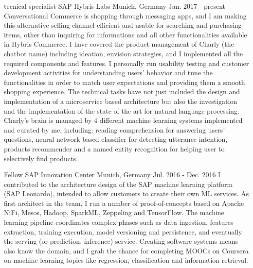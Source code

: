 

\begin{cventries}

  \cventry
    {tecnical specialist} %
    {SAP Hybris Labs} %
    {Munich, Germany} %
    {Jan. 2017 - present} %
    {
      Conversational Commerce is shopping through messaging apps, and I am making this alternative selling channel
      efficient and usable for searching and purchasing items, other than inquiring for informations and
      all other functionalities available in Hybris Commerce.
      I have covered the product management of Charly (the chatbot name) including ideation, envision strategies,
      and I implemented all the required components and features.
      I personally run usability testing and customer development activities for understanding users' behavior and
      tune the functionalities in order to match user expectations and providing them a smooth shopping experience.
      The technical tasks have not just included the design and implementation of a microservice based architecture
      but also the investigation and the implementation of the state of the art for natural language processing.
      Charly's brain is managed by 4 different machine learning systems implemented and curated by me, including: reading comprehension for answering users'
      questions, neural network based classifier for detecting utterance intention, products recommender and a named entity recognition
      for helping user to selectively find products.
    }

  \cventry
    {Fellow} %
    {SAP Innovation Center} %
    {Munich, Germany} %
    {Jul. 2016 - Dec. 2016} %
    {
      I contributed to the architecture design of the SAP machine learning platform (SAP Leonardo), intended to allow customers to create their own ML services.
      As first architect in the team, I run a number of proof-of-concepts based on Apache NiFi, Mesos, Hadoop, SparkML,
      Zeppeling and TensorFlow. The machine learning pipeline coordinates complex phases such as data ingestion, features extraction, training execution,
      model versioning and persistence, and eventually the serving (or prediction, inference) service. Creating software systems means also know the domain,
      and I grab the chance for completing MOOCs on Coursera on machine learning topics like regression, classification and information retrieval.
    }


\end{cventries}
